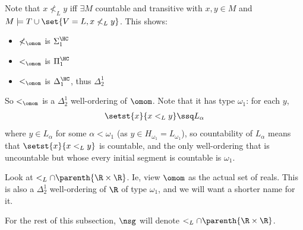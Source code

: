 Note that $x \not<_{L} y$ iff $\exists M$ countable and transitive with $x, y \in M$ and $M \models T \cup \set{V = L, x \not<_L y}$. This shows:
\begin{itemize}
    \item $\not<_{\omom}$ is $\Sigma_1^{\HC}$
    \item $<_{\omom}$ is $\Pi_1^{\HC}$
    \item $<_{\omom}$ is $\Delta_1^{\HC}$, thus $\Delta^1_2$
\end{itemize}

So $<_{\omom}$ is a $\Delta^1_2$ well-ordering of $\omom$. Note that it has type $\omega_1$: for each $y$,
\begin{align*}
    \setst{x}{x <_L y} \ssq L_{\alpha}
\end{align*}
where $y \in L_{\alpha}$ for some $\alpha < \omega_1$ (as $y \in H_{\omega_1} = L_{\omega_1}$), so countability of $L_{\alpha}$ means that $\setst{x}{x <_L y}$ is countable, and the only well-ordering that is uncountable but whose every initial segment is countable is $\omega_1$.

Look at $<_L \cap \parenth{\R \times \R}$. Ie, view $\omom$ as the actual set of reals. This is also a $\Delta^1_2$ well-ordering of $\R$ of type $\omega_1$, and we will want a shorter name for it.

\begin{boxnotation}
    For the rest of this subsection, $\nsg$ will denote $<_L \cap \parenth{\R \times \R}$.
\end{boxnotation}

